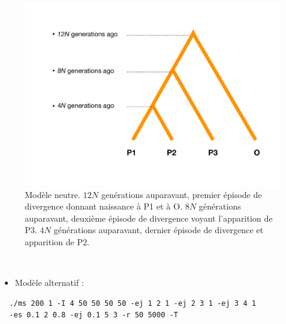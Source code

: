 \documentclass[12pt,twoside]{reedthesis}
\providecommand{\tightlist}{%
  \setlength{\itemsep}{0pt}\setlength{\parskip}{0pt}}
\begin{document}
  \begin{figure}
  
  {\centering \includegraphics[scale=0.5]{figure/background} 
  
  }
  
  \caption{Modèle neutre. $12N$ genérations auparavant, premier épisode de divergence donnant naissance à P1 et à O. $8N$ générations auparavant, deuxième épisode de divergence voyant l'apparition de P3. $4N$ générations auparavant, dernier épisode de divergence et apparition de P2.}\label{fig:background}
  \end{figure}
  
  ~
  
  \begin{itemize}
  \tightlist
  \item
    Modèle alternatif :
  \end{itemize}
  
  \begin{verbatim}
  ./ms 200 1 -I 4 50 50 50 50 -ej 1 2 1 -ej 2 3 1 -ej 3 4 1 
  -es 0.1 2 0.8 -ej 0.1 5 3 -r 50 5000 -T
  \end{verbatim}
  
\end{document}
